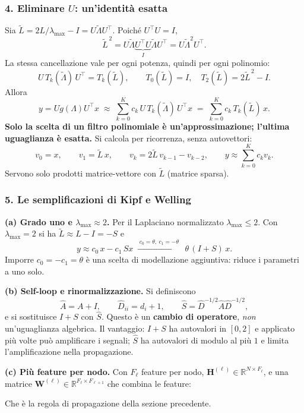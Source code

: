 \documentclass[11pt,a4paper]{article}
\newcommand{\R}{\mathbb{R}}
\begin{document}
\subsubsection{4. Eliminare $U$: un'identità esatta}
Sia $\widetilde L=2L/\lambda_{\max}-I=U\widetilde\Lambda U^\top$. Poiché $U^\top U=I$,
\[
\widetilde L^{\,2}=U\widetilde\Lambda\underbrace{U^\top U}_{I}\widetilde\Lambda U^\top=U\widetilde\Lambda^{2}U^\top .
\]
La stessa cancellazione vale per ogni potenza, quindi per ogni polinomio:
\[
U\,T_k(\widetilde\Lambda)\,U^\top=T_k(\widetilde L),\qquad T_0(\widetilde L)=I,\quad T_2(\widetilde L)=2\widetilde L^{\,2}-I .
\]
Allora
\[
y=Ug(\Lambda)U^\top x\;\approx\;\sum_{k=0}^{K}c_k\,U\,T_k(\widetilde\Lambda)\,U^\top x\;=\;\sum_{k=0}^{K}c_k\,T_k(\widetilde L)\,x .
\]
\textbf{Solo la scelta di un filtro polinomiale è un'approssimazione; l'ultima
uguaglianza è esatta.} Si calcola per ricorrenza, senza autovettori:
\[
v_0=x,\qquad v_1=\widetilde L\,x,\qquad v_k=2\widetilde L\,v_{k-1}-v_{k-2},
\qquad y\approx\sum_{k=0}^{K}c_k v_k .
\]
Servono solo prodotti matrice-vettore con $\widetilde L$ (matrice sparsa).
 
\subsubsection{5. Le semplificazioni di Kipf e Welling}
\textbf{(a) Grado uno e $\lambda_{\max}\approx2$.} Per il Laplaciano normalizzato
$\lambda_{\max}\le2$. Con $\lambda_{\max}=2$ si ha $\widetilde L\approx L-I=-S$ e
\[
y\approx c_0\,x-c_1\,Sx\;\xrightarrow{\;c_0=\theta,\ c_1=-\theta\;}\;\theta\,(I+S)\,x .
\]
Imporre $c_0=-c_1=\theta$ è una scelta di modellazione aggiuntiva: riduce i
parametri a uno solo.
 
\textbf{(b) Self-loop e rinormalizzazione.} Si definiscono
\[
\hat{A}=A+I,\qquad \hat{D}_{ii}=d_i+1,\qquad \hat{S}=\hat{D}^{-1/2}\hat{A}\hat{D}^{-1/2},
\]
e si sostituisce $I+S$ con $\hat{S}$. Questo è un \textbf{cambio di operatore},
\emph{non} un'uguaglianza algebrica. Il vantaggio: $I+S$ ha autovalori in
$[0,2]$ e applicato più volte può amplificare i segnali; $\hat{S}$ ha autovalori
di modulo al più $1$ e limita l'amplificazione nella propagazione.
 
\textbf{(c) Più feature per nodo.} Con $F_\ell$ feature per nodo, $\mathbf{H}^{(\ell)}\in\R^{N\times F_\ell}$,
e una matrice $\mathbf{W}^{(\ell)}\in\R^{F_\ell\times F_{\ell+1}}$ che combina le
feature:
\begin{center}
\end{center}
Che è la regola di propagazione della sezione precedente.
 
\end{document}
